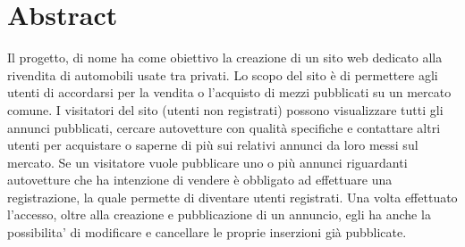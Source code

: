 \section*{Abstract}
Il progetto, di nome  ha come obiettivo la creazione di un sito web dedicato alla rivendita di automobili usate tra privati. Lo scopo del sito è di permettere agli utenti di accordarsi per la vendita o l’acquisto di mezzi pubblicati su un mercato comune.
I visitatori del sito (utenti non registrati) possono visualizzare tutti gli annunci pubblicati, cercare autovetture con qualità specifiche e contattare altri utenti per acquistare o saperne di più sui relativi annunci da loro messi sul mercato. Se un visitatore vuole pubblicare uno o pi\`u annunci riguardanti autovetture che ha intenzione di vendere è obbligato ad effettuare una registrazione, la quale permette di diventare utenti registrati. Una volta effettuato l'accesso, oltre alla creazione e pubblicazione di un annuncio, egli ha anche la possibilita' di modificare e cancellare le proprie inserzioni gi\`a pubblicate.
